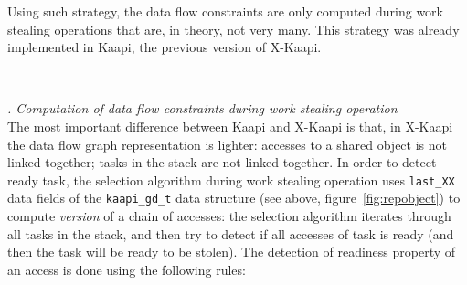 \documentclass{report}
\newcommand{\kaapi}{\textsc{X}-Kaapi\xspace}
\renewcommand{\subsubsection}[1]{~\\ \addtocounter{subsubsection}{1} \noindent\textit{
\thesubsubsection. #1\\}}
\begin{document}
Using such strategy, the data flow constraints are only computed during work stealing operations that are, in theory, not very many. This strategy was already implemented in Kaapi, the previous version of \kaapi.

\subsubsection{Computation of data flow constraints during work stealing operation}
The most important difference between Kaapi and \kaapi is that, in \kaapi the data flow graph representation is lighter: accesses to a shared object is not linked together; tasks in the stack are not linked together.
In order to detect ready task, the selection algorithm during work stealing operation uses \verb+last_XX+ data fields of the \verb+kaapi_gd_t+ data structure (see above, figure~\ref{fig:repobject}) to compute \textit{version} of a chain of accesses:
the selection algorithm iterates through all tasks in the stack, and then try to detect if all accesses of task is ready (and then the task will be ready to be stolen). The detection of readiness property of an access is done using the following rules:
\end{document}
